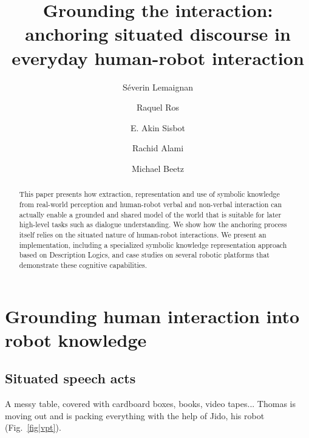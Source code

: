 \documentclass[twocolumn]{svjour3}
\begin{document}

\title{Grounding the interaction: anchoring situated discourse in everyday human-robot interaction}

\author{
Séverin Lemaignan \and
Raquel Ros \and
E. Akin Sisbot \and
Rachid Alami \and
Michael Beetz
}


\maketitle

\begin{abstract}
This paper presents how extraction, representation and use of symbolic
knowledge from real-world perception and human-robot verbal and non-verbal
interaction can actually enable a grounded and shared model of the world that
is suitable for later high-level tasks such as dialogue understanding. We show how
the anchoring process itself relies on the situated nature of human-robot
interactions. We present an implementation, including a specialized symbolic
knowledge representation approach based on Description Logics, and case studies
on several robotic platforms that demonstrate these cognitive capabilities.
\end{abstract}

\section{Grounding human interaction into robot knowledge}

\subsection{Situated speech acts}
\label{intro_example}

A messy table, covered with cardboard boxes, books, video tapes... Thomas is
moving out and is packing everything with the help of Jido, his robot
(Fig.~\ref{fig|vpt}).
\end{document}
